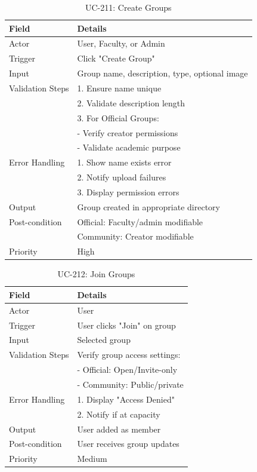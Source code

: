 \begin{table}[H]
\centering
\caption{UC-211: Create Groups}
\begin{tabular}{|l|p{10cm}|}
\hline
\textbf{Field} & \textbf{Details} \\ \hline
Actor & User, Faculty, or Admin \\ \hline
Trigger & Click "Create Group" \\ \hline
Input & Group name, description, type, optional image \\ \hline
Validation Steps & 1. Ensure name unique \\ 
                 & 2. Validate description length \\ 
                 & 3. For Official Groups: \\ 
                 & - Verify creator permissions \\ 
                 & - Validate academic purpose \\ \hline
Error Handling & 1. Show name exists error \\ 
               & 2. Notify upload failures \\ 
               & 3. Display permission errors \\ \hline
Output & Group created in appropriate directory \\ \hline
Post-condition & Official: Faculty/admin modifiable \\ 
               & Community: Creator modifiable \\ \hline
Priority & High \\ \hline
\end{tabular}
\end{table}

\begin{table}[H]
\centering
\caption{UC-212: Join Groups}
\begin{tabular}{|l|p{10cm}|}
\hline
\textbf{Field} & \textbf{Details} \\ \hline
Actor & User \\ \hline
Trigger & User clicks "Join" on group \\ \hline
Input & Selected group \\ \hline
Validation Steps & Verify group access settings: \\ 
                 & - Official: Open/Invite-only \\ 
                 & - Community: Public/private \\ \hline
Error Handling & 1. Display "Access Denied" \\ 
               & 2. Notify if at capacity \\ \hline
Output & User added as member \\ \hline
Post-condition & User receives group updates \\ \hline
Priority & Medium \\ \hline
\end{tabular}
\end{table}

